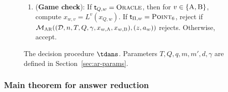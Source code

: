 \documentclass[11pt]{article}
\theoremstyle{definition}
\newcommand{\decider}{\mathcal{D}}
\newcommand{\gamestyle}[1]{\ensuremath{\textsc{#1}}\xspace}
\newcommand{\ar}{\gamestyle{AR}}
\newcommand{\labelstyle}[1]{\ensuremath{\textsc{#1}}\xspace}
\newcommand{\tvarstyle}[1]{\mathsf{#1}}
\newcommand{\tvar}{\ensuremath{\tvarstyle{t}}}
\newcommand{\alice}{\labelstyle{A}}
\newcommand{\bob}{\labelstyle{B}}
\newcommand{\oracle}{\labelstyle{Oracle}}
\newcommand{\typestyle}[1]{\ensuremath{\textsc{#1}}\xspace}
\newcommand{\Point}{\typestyle{Point}}
\newenvironment{gamespec}{
  \begin{mdframed}[style=figstyle]}{
  \end{mdframed}}
\newcommand{\pcpverifier}{\mathcal{M}_\ar}
\newcommand{\qlen}{Q}
\begin{document}
\begin{figure}[!htb]
\begin{gamespec}
{\begin{enumerate}
    \item (\textbf{Game check}): If $\tvar_{Q,w} = \oracle$, then for $v \in
      \{\alice,\bob\}$, compute $x_{w,v} = L^{v}(x_{Q,w})$.
      If $\tvar_{\Pi,w} = \Point_6$, reject if $\pcpverifier((\decider, n , T,
      \qlen, \gamma, x_{w,\alice}, x_{w,\bob}), (z, a_{w} ))$ rejects.
      Otherwise, accept. 
      \label{enu:ar-game}
    \end{enumerate}
  }
  \end{gamespec}
  
  \caption{The decision procedure $\tdans$.
    Parameters $T,Q,q,m,m',d,\gamma$ are defined in
    Section~\ref{sec:ar-params}.}
  \label{fig:decider-pcp}
  
\end{figure}

\subsubsection{Main theorem for answer reduction}
\end{document}
